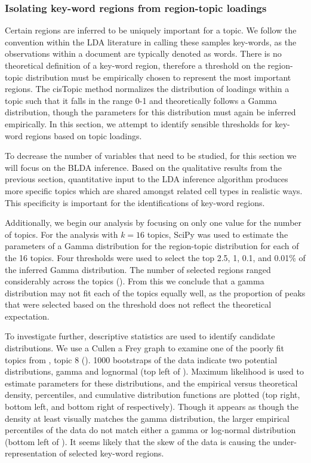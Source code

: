 \subsubsection{Isolating key-word regions from region-topic loadings}

Certain regions are inferred to be uniquely important for a topic. We follow the convention within the LDA literature in calling these samples key-words, as the observations within a document are typically denoted as words. There is no theoretical definition of a key-word region, therefore a threshold on the region-topic distribution must be empirically chosen to represent the most important regions. The cisTopic method normalizes the distribution of loadings within a topic such that it falls in the range 0-1 and theoretically follows a Gamma distribution, though the parameters for this distribution must again be inferred empirically. In this section, we attempt to identify sensible thresholds for key-word regions based on topic loadings. 

To decrease the number of variables that need to be studied, for this section we will focus on the BLDA inference. Based on the qualitative results from the previous section, quantitative input to the LDA inference algorithm produces more specific topics which are shared amongst related cell types in realistic ways. This specificity is important for the identifications of key-word regions. 

Additionally, we begin our analysis by focusing on only one value for the number of topics. For the analysis with $k = 16$ topics, SciPy was used to estimate the parameters of a Gamma distribution for the region-topic distribution for each of the 16 topics. Four thresholds were used to select the top 2.5, 1, 0.1, and 0.01\% of the inferred Gamma distribution. The number of selected regions ranged considerably across the topics (). From this we conclude that a gamma distribution may not fit each of the topics equally well, as the proportion of peaks that were selected based on the threshold does not reflect the theoretical expectation. 

To investigate further, descriptive statistics are used to identify candidate distributions. We use a Cullen a Frey graph to examine one of the poorly fit topics from , topic 8 (). 1000 bootstraps of the data indicate two potential distributions, gamma and lognormal (top left of ). Maximum likelihood is used to estimate parameters for these distributions, and the empirical versus theoretical density, percentiles, and cumulative distribution functions are plotted (top right, bottom left, and bottom right of  respectively).  Though it appears as though the density at least visually matches the gamma distribution, the larger empirical percentiles of the data do not match either a gamma or log-normal distribution (bottom left of ). It seems likely that the skew of the data is causing the under-representation of selected key-word regions. 


